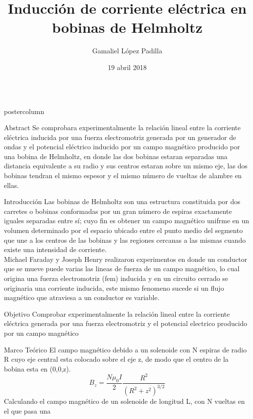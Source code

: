 \documentclass{beamer}
\title{\huge Inducción de corriente eléctrica en bobinas de Helmholtz}
\author{Gamaliel López Padilla}
\institute[FCFM]{Facultad de Ciencias Fisico Matematicas}
\date{19 abril 2018}
\newlength{\columnheight}
\begin{document}
\begin{columns}
\begin{column}{.50\textwidth}
\begin{beamercolorbox}[center]{postercolumn}
\begin{minipage}{.98\textwidth}  
\parbox[t][\columnheight]{\textwidth}{ 
\vspace*{1cm}
\begin{myblock}{Abstract}
Se comprobara experimentalmente la relación lineal entre la corriente eléctrica inducida por una fuerza electromotriz generada por un generador de ondas y el potencial eléctrico inducido por un campo magnético producido por una bobina de Helmholtz, en donde las dos bobinas estaran separadas una distancia equivalente a su radio y sus centros estaran sobre un mismo eje, las dos bobinas tendran el mismo espesor y el mismo número de vueltas de alambre en ellas.
\end{myblock}
\begin{myblock}{Introducción}
Las bobinas de Helmholtz son una estructura constituida por dos carretes o bobinas conformadas por un gran número de espiras exactamente iguales separadas entre sí; cuyo fin es obtener un campo magnético unifrme en un volumen determinado por el espacio ubicado entre el punto medio del segmento que une a los centros de las bobinas y las regiones cercanas a las mismas cuando existe una intensidad de corriente.\\
Michael Faraday y Joseph Henry realizaron experimentos en donde un conductor que se mueve puede varias las lineas de fuerza de un campo magnético, lo cual origina una fuerza electromotriz (fem) inducida y en un circuito cerrado se originaria una corriente inducida, este mismo fenomeno sucede si un flujo magnético que atraviesa a un conductor es variable.
\end{myblock}
\begin{myblock}{Objetivo}
Comprobar experimentalmente la relación lineal entre la corriente eléctrica generada por una fuerza electromotriz y el potencial electrico producido por un campo magnético
\end{myblock}
\begin{myblock}{Marco Teórico}
El campo magnético debido a un solenoide con N espiras de radio R cuyo eje central esta colocado sobre el eje z, de modo que el centro de la bobina esta en (0,0,z).
\begin{equation}
B_z= \frac{N \mu_0 I}{2} \frac{R^2}{(R^2+z^2)^{3/2}}
\end{equation}
Calculando el campo magnético de un solenoide de longitud L, con N vueltas en el que pasa una 

\end{myblock}}
\end{minipage}
\end{beamercolorbox}
\end{column}
\end{columns}
\end{document}
